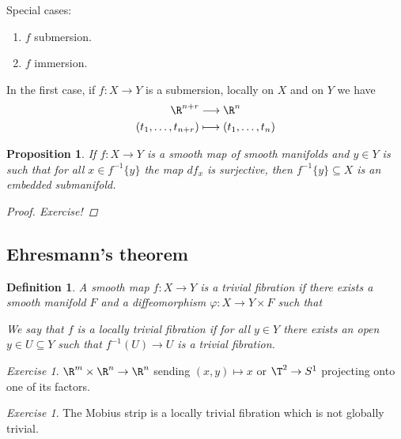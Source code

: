 \documentclass[A4paper, british]{amsart}
\theoremstyle{darkgreentheorem}
\newtheorem{prop}[thm]{Proposition}
\theoremstyle{darkbluedefinition}
\newtheorem{defn}[thm]{Definition}
\theoremstyle{darkredexample}
\theoremstyle{remark}
\newtheorem{exe}[thm]{Exercise}
\newcommand{\1}{\mathbbm{1}}
\newcommand{\tms}{\times}
\newcommand{\sub}{\subseteq}
\begin{document}
Special cases:
\begin{enumerate}
    \item $f$ submersion.
    \item $f$ immersion.
\end{enumerate}

In the first case, if $f\colon X\to Y$ is a submersion, locally on $X$ and on $Y$ we have
\begin{align*}
    \R^{n+r} &\longrightarrow \R^{n} \\
    (t_{1},\ldots,t_{n+r})&\longmapsto (t_{1},\ldots,t_{n})
\end{align*}

\begin{prop}
    If $f\colon X\to Y$ is a smooth map of smooth manifolds and $y\in Y$ is such that for all $x\in f^{-1}\{y\}$ the map $df_{x}$ is surjective, then $f^{-1}\{y\}\sub X$ is an embedded submanifold.
    \begin{proof}
	Exercise!
    \end{proof}
\end{prop}

\subsection{Ehresmann's theorem}

\begin{defn}
    A smooth map $f\colon X\to Y$ is a \textit{trivial fibration} if there exists a smooth manifold $F$ and a diffeomorphism $\varphi\colon X\to Y\tms F$ such that
    \begin{center}
    \end{center}
    We say that $f$ is a \textit{locally trivial fibration} if for all $y\in Y$ there exists an open $y\in U\sub Y$ such that $f^{-1}(U)\to U$ is a trivial fibration.
\end{defn}

\begin{exe}
    $\R^{m}\tms \R^{n}\to \R^{n}$ sending $(x,y)\mapsto x$ or $\T^{2}\to S^{1}$ projecting onto one of its factors.
\end{exe}

\begin{exe}
    The Mobius strip is a locally trivial fibration which is not globally trivial.
\end{exe}
\end{document}
